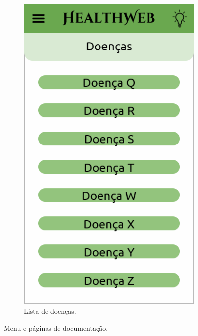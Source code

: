 \begin{figure}[htbp]
\begin{subfigure}{0.24\linewidth}
		\includegraphics[width=\linewidth]{figure/prototype/mobile/list_disease.png}
		\caption{Lista de doenças.}
		\label{fig:mobile:list_disease}
	\end{subfigure}
	\caption{Menu e páginas de documentação.}
	\label{fig:mobile:drawer_about_terms_list_disease}
\end{figure}

